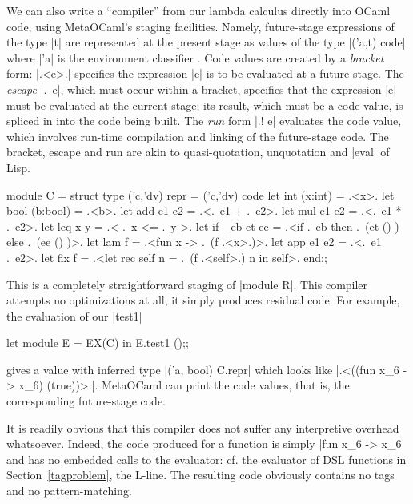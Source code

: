 \documentclass[preprint]{sigplanconf}
\let\cite=\citep
\begin{document}
We can also write a ``compiler'' from our lambda calculus directly
into OCaml code, using MetaOCaml's staging facilities. Namely,
future-stage expressions of the type |t| are represented at the
present stage as values of the type |('a,t) code| where |'a| is the
environment classifier \cite{WalidPOPL03,WalidESOP04}. Code values are created
by a \emph{bracket} form: |.<e>.| specifies the expression |e| is to be
evaluated at a future stage. The \emph{escape} |.~e|, which must occur
within a bracket, specifies that the expression |e| must be evaluated
at the current stage; its result, which must be a code value, is
spliced in into the code being built. The \emph{run} form |.! e|
evaluates the code value, which involves run-time compilation and
linking of the future-stage code. The bracket, escape and run are akin to
quasi-quotation, unquotation and |eval| of Lisp.


\begin{code}
module C = struct
  type ('c,'dv) repr = ('c,'dv) code
  let int (x:int)   = .<x>.
  let bool (b:bool) = .<b>.
  let add e1 e2     = .<.~e1 + .~e2>.
  let mul e1 e2     = .<.~e1 * .~e2>.
  let leq x y       = .< .~x <= .~y >.
  let if_ eb et ee = 
    .<if .~eb then .~(et () ) else .~(ee () )>.
  let lam f         = .<fun x -> .~(f .<x>.)>.
  let app e1 e2     = .<.~e1 .~e2>.
  let fix f = 
     .<let rec self n = .~(f .<self>.) n in self>.
end;;
\end{code}
This is a completely straightforward staging of
|module R|.
This compiler attempts no optimizations at all, it simply produces
residual code. For example, the evaluation of our |test1|
\begin{code}
  let module E = EX(C) in E.test1 ();;
\end{code}
gives a value with inferred type |('a, bool) C.repr| which looks
like |.<((fun x_6 -> x_6) (true))>.|. MetaOCaml can print the code
values, that is, the corresponding future-stage code.

It is readily obvious that this compiler does not suffer
any interpretive overhead whatsoever. Indeed, the
  code produced for a function is simply |fun x_6 -> x_6| and has no 
  embedded calls to the evaluator: cf. the evaluator of DSL functions
  in Section~\ref{tagproblem}, the L-line.
The resulting code obviously contains no tags and no pattern-matching.
\end{document}
